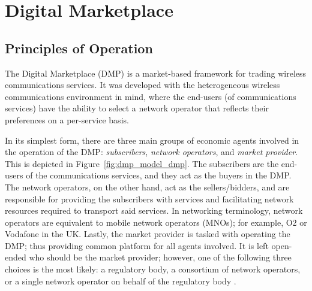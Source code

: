 \chapter{Digital Marketplace} %
\label{cha:dmp}

\minitoc
\vspace{10mm}

\section{Principles of Operation} %
\label{sec:principles_of_operation_dmp}
The Digital Marketplace (DMP) is a market-based framework for trading wireless communications services. It was developed with the heterogeneous wireless communications environment in mind, where the end-users (of communications services) have the ability to select a network operator that reflects their preferences on a per-service basis.

In its simplest form, there are three main groups of economic agents involved in the operation of the DMP: \emph{subscribers}, \emph{network operators}, and \emph{market provider}. This is depicted in Figure~\ref{fig:dmp_model_dmp}. The subscribers are the end-users of the communications services, and they act as the buyers in the DMP. The network operators, on the other hand, act as the sellers/bidders, and are responsible for providing the subscribers with services and facilitating network resources required to transport said services. In networking terminology, network operators are equivalent to mobile network operators (MNOs); for example, O2 or Vodafone in the UK. Lastly, the market provider is tasked with operating the DMP; thus providing common platform for all agents involved. It is left open-ended who should be the market provider; however, one of the following three choices is the most likely: a regulatory body, a consortium of network operators, or a single network operator on behalf of the regulatory body \cite{DMLeBodic00,DMIrvine02}.

